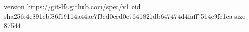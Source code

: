 version https://git-lfs.github.com/spec/v1
oid sha256:4e891cbf86f19114a44ac7f3cd0ccd0e7641821db647474d4faff7514e9fc1ca
size 87544
